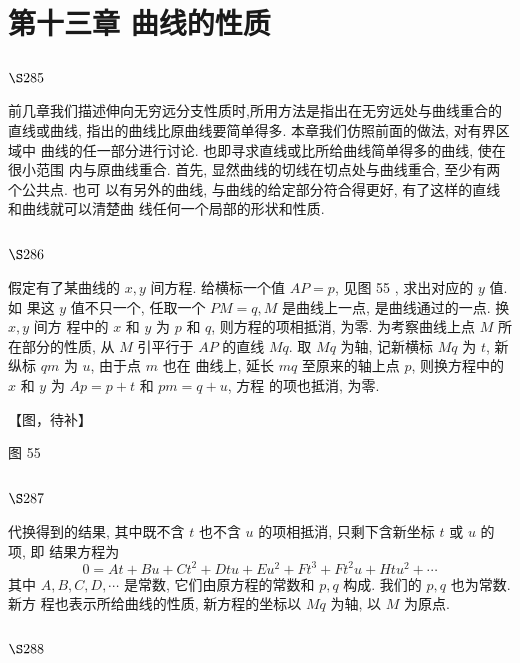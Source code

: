 \chapter{第十三章 曲线的性质}

\section{$\S 285$}

前几章我们描述伸向无穷远分支性质时,所用方法是指出在无穷远处与曲线重合的 直线或曲线, 指出的曲线比原曲线要简单得多. 本章我们仿照前面的做法, 对有界区域中 曲线的任一部分进行讨论. 也即寻求直线或比所给曲线简单得多的曲线, 使在很小范围 内与原曲线重合. 首先, 显然曲线的切线在切点处与曲线重合, 至少有两个公共点. 也可 以有另外的曲线, 与曲线的给定部分符合得更好, 有了这样的直线和曲线就可以清楚曲 线任何一个局部的形状和性质.

\section{$\S 286$}

假定有了某曲线的 $x, y$ 间方程. 给横标一个值 $A P=p$, 见图 55 , 求出对应的 $y$ 值. 如 果这 $y$ 值不只一个, 任取一个 $P M=q, M$ 是曲线上一点, 是曲线通过的一点. 换 $x, y$ 间方 程中的 $x$ 和 $y$ 为 $p$ 和 $q$, 则方程的项相抵消, 为零. 为考察曲线上点 $M$ 所在部分的性质, 从 $M$ 引平行于 $A P$ 的直线 $M q$. 取 $M q$ 为轴, 记新横标 $M q$ 为 $t$, 新纵标 $q m$ 为 $u$, 由于点 $m$ 也在 曲线上, 延长 $m q$ 至原来的轴上点 $p$, 则换方程中的 $x$ 和 $y$ 为 $A p=p+t$ 和 $p m=q+u$, 方程 的项也抵消, 为零.


【图，待补】

图 55

\section{$\S 287$}

代换得到的结果, 其中既不含 $t$ 也不含 $u$ 的项相抵消, 只剩下含新坐标 $t$ 或 $u$ 的项, 即 结果方程为
\[
0=A t+B u+C t^{2}+D t u+E u^{2}+F t^{3}+F t^{2} u+H t u^{2}+\cdots
\]
其中 $A, B, C, D, \cdots$ 是常数, 它们由原方程的常数和 $p, q$ 构成. 我们的 $p, q$ 也为常数. 新方 程也表示所给曲线的性质, 新方程的坐标以 $M q$ 为轴, 以 $M$ 为原点.

\section{$\S 288$}

